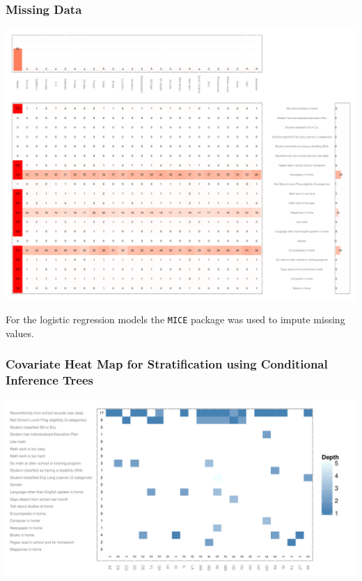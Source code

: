 \documentclass[10pt,handout,mathserif]{beamer}
\begin{document}
\begin{frame}[c]
	\frametitle{Missing Data}
	\begin{center}
	\includegraphics[height=.70\paperheight,keepaspectratio=true]{../Figures2009/g4math-missing.pdf} \\
	\end{center}
	For the logistic regression models the \texttt{MICE} \cite{mice} package was used to impute missing values.
\end{frame}

\begin{frame}[c]
	\frametitle{Covariate Heat Map for Stratification using Conditional Inference Trees}
	\begin{center}
	\includegraphics[width=\paperwidth,keepaspectratio]{../Figures2009/g4math-mlpsa-ctree-heat}
	\end{center}
\end{frame}
\end{document}
